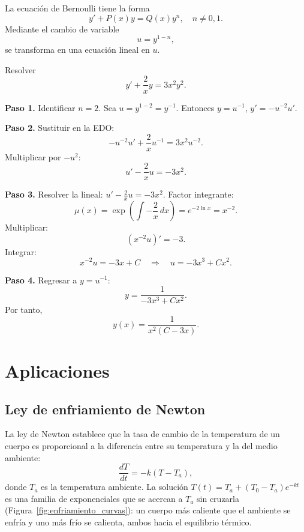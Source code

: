 La ecuación de Bernoulli tiene la forma
\[
y' + P(x)y = Q(x)y^n, \quad n \neq 0,1.
\]
Mediante el cambio de variable
\[
u = y^{1-n},
\]
se transforma en una ecuación lineal en \(u\).

\begin{example}
Resolver
\[
y' + \frac{2}{x} y = 3x^2 y^2.
\]

\begin{myproof}
\textbf{Paso 1.} Identificar \(n=2\). Sea \(u = y^{1-2} = y^{-1}\). Entonces \(y = u^{-1}\), \(y' = -u^{-2}u'\).

\textbf{Paso 2.} Sustituir en la EDO:
\[
-u^{-2}u' + \frac{2}{x} u^{-1} = 3x^2 u^{-2}.
\]
Multiplicar por \(-u^2\):
\[
u' - \frac{2}{x}u = -3x^2.
\]

\textbf{Paso 3.} Resolver la lineal: \(u' - \frac{2}{x}u = -3x^2\). Factor integrante:
\[
\mu(x) = \exp\left(\int -\frac{2}{x}\,dx\right) = e^{-2\ln x} = x^{-2}.
\]
Multiplicar:
\[
(x^{-2} u)' = -3.
\]
Integrar:
\[
x^{-2} u = -3x + C \quad\Rightarrow\quad u = -3x^3 + C x^2.
\]

\textbf{Paso 4.} Regresar a \(y = u^{-1}\):
\[
y = \frac{1}{-3x^3 + C x^2}.
\]
Por tanto,
\[
\boxed{y(x) = \frac{1}{x^2(C - 3x)}}.
\]
\end{myproof}
\end{example}

\section{Aplicaciones}

\subsection{Ley de enfriamiento de Newton}
La ley de Newton establece que la tasa de cambio de la temperatura de un cuerpo es proporcional a la diferencia entre su temperatura y la del medio ambiente:
\[
\frac{dT}{dt} = -k(T - T_a),
\]
donde \(T_a\) es la temperatura ambiente. La solución \(T(t)=T_a+(T_0-T_a)e^{-kt}\) es una familia de exponenciales que se acercan a \(T_a\) sin cruzarla (Figura~\ref{fig:enfriamiento_curvas}): un cuerpo más caliente que el ambiente se enfría y uno más frío se calienta, ambos hacia el equilibrio térmico.

